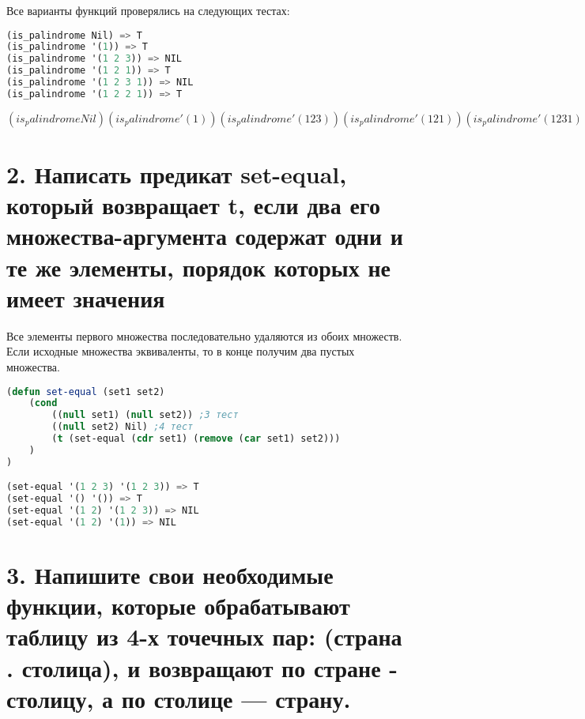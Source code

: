 \documentclass[12pt]{report}
\begin{document}
Все варианты функций проверялись на следующих тестах:
\begin{lstlisting}[language=Lisp]
(is_palindrome Nil) => T
(is_palindrome '(1)) => T
(is_palindrome '(1 2 3)) => NIL
(is_palindrome '(1 2 1)) => T
(is_palindrome '(1 2 3 1)) => NIL
(is_palindrome '(1 2 2 1)) => T
\end{lstlisting}

$
(is_palindrome Nil)
(is_palindrome '(1))
(is_palindrome '(1 2 3))
(is_palindrome '(1 2 1))
(is_palindrome '(1 2 3 1))
(is_palindrome '(1 2 2 1))
$
\fi



\clearpage
\section*{2. Написать предикат set-equal, который возвращает t, если два его множества-аргумента содержат одни и те же элементы, порядок которых не имеет значения}

Все элементы первого множества последовательно удаляются из обоих множеств. Если исходные множества эквиваленты, то в конце получим два пустых множества.

\begin{lstlisting}[language=Lisp]
(defun set-equal (set1 set2)
	(cond 
		((null set1) (null set2)) ;3 тест
		((null set2) Nil) ;4 тест
		(t (set-equal (cdr set1) (remove (car set1) set2)))
	)
)

(set-equal '(1 2 3) '(1 2 3)) => T
(set-equal '() '()) => T
(set-equal '(1 2) '(1 2 3)) => NIL
(set-equal '(1 2) '(1)) => NIL
\end{lstlisting}



\clearpage
\section*{3. Напишите свои необходимые функции, которые обрабатывают таблицу из 4-х точечных пар: (страна . столица), и возвращают по стране - столицу, а по столице — страну.}
\end{document}
